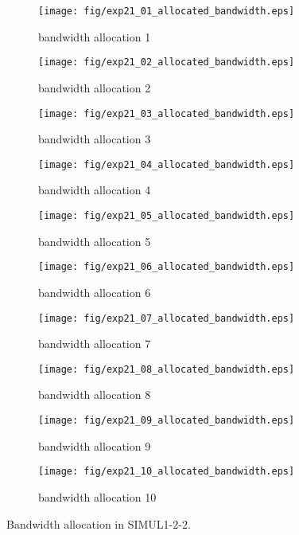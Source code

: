 	\begin{figure}
		\begin{center}
			\begin{subfigure}[b]{0.32\textwidth}
				\texttt{[image: fig/exp21\_01\_allocated\_bandwidth.eps]}
				\caption{bandwidth allocation 1}
				\label{figure:simul1_2_2_b_a}
			\end{subfigure}
			\begin{subfigure}[b]{0.32\textwidth}
				\texttt{[image: fig/exp21\_02\_allocated\_bandwidth.eps]}
				\caption{bandwidth allocation 2}
				\label{figure:simul1_2_2_b_b}
			\end{subfigure}
			\begin{subfigure}[b]{0.32\textwidth}
				\texttt{[image: fig/exp21\_03\_allocated\_bandwidth.eps]}
				\caption{bandwidth allocation 3}
				\label{figure:simul1_2_2_b_c}
			\end{subfigure}
			\begin{subfigure}[b]{0.32\textwidth}
				\texttt{[image: fig/exp21\_04\_allocated\_bandwidth.eps]}
				\caption{bandwidth allocation 4}
				\label{figure:simul1_2_2_b_d}
			\end{subfigure}
			\begin{subfigure}[b]{0.32\textwidth}
				\texttt{[image: fig/exp21\_05\_allocated\_bandwidth.eps]}
				\caption{bandwidth allocation 5}
				\label{figure:simul1_2_2_b_e}
			\end{subfigure}
			\begin{subfigure}[b]{0.32\textwidth}
				\texttt{[image: fig/exp21\_06\_allocated\_bandwidth.eps]}
				\caption{bandwidth allocation 6}
				\label{figure:simul1_2_2_b_f}
			\end{subfigure}
			\begin{subfigure}[b]{0.32\textwidth}
				\texttt{[image: fig/exp21\_07\_allocated\_bandwidth.eps]}
				\caption{bandwidth allocation 7}
				\label{figure:simul1_2_2_b_g}
			\end{subfigure}
			\begin{subfigure}[b]{0.32\textwidth}
				\texttt{[image: fig/exp21\_08\_allocated\_bandwidth.eps]}
				\caption{bandwidth allocation 8}
				\label{figure:simul1_2_2_b_h}
			\end{subfigure}
			\begin{subfigure}[b]{0.32\textwidth}
				\texttt{[image: fig/exp21\_09\_allocated\_bandwidth.eps]}
				\caption{bandwidth allocation 9}
				\label{figure:simul1_2_2_b_i}
			\end{subfigure}
			\begin{subfigure}[b]{0.32\textwidth}
				\texttt{[image: fig/exp21\_10\_allocated\_bandwidth.eps]}
				\caption{bandwidth allocation 10}
				\label{figure:simul1_2_2_b_j}
			\end{subfigure}
			\caption{Bandwidth allocation in SIMUL1-2-2.}
			\label{figure:simul1_2_2_ba}
		\end{center}
	\end{figure}

